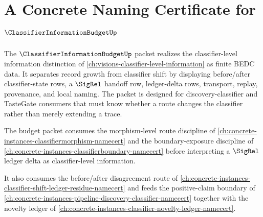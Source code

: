 \chapter{A Concrete Naming Certificate for $\ClassifierInformationBudgetUp$}
\label{ch:concrete-instances-classifier-information-budget-namecert}

The $\ClassifierInformationBudgetUp$ packet realizes the classifier-level information distinction of \autoref{ch:visions-classifier-level-information} as finite BEDC data. It separates record growth from classifier shift by displaying before/after classifier-state rows, a $\SigRel$ handoff row, ledger-delta rows, transport, replay, provenance, and local naming. The packet is designed for discovery-classifier and TasteGate consumers that must know whether a route changes the classifier rather than merely extending a trace.

The budget packet consumes the morphism-level route discipline of \autoref{ch:concrete-instances-classifiermorphism-namecert} and the boundary-exposure discipline of \autoref{ch:concrete-instances-classifierboundary-namecert} before interpreting a $\SigRel$ ledger delta as classifier-level information.

It also consumes the before/after disagreement route of \autoref{ch:concrete-instances-classifier-shift-ledger-residue-namecert} and feeds the positive-claim boundary of \autoref{ch:concrete-instances-pipeline-discovery-classifier-namecert} together with the novelty ledger of \autoref{ch:concrete-instances-classifier-novelty-ledger-namecert}.


